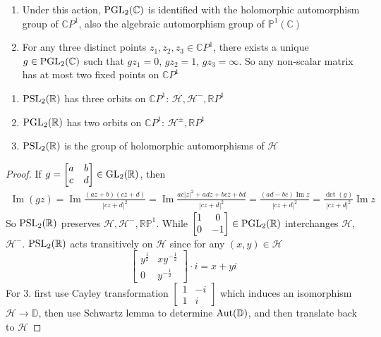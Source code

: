 \documentclass[main.tex]{subfiles}
\begin{document}
\begin{fact}\hfill
\begin{enumerate}
\item Under this action, $\operatorname{PGL}_2(\mathbb C)$ is identified with the holomorphic automorphism group of $\mathbb CP^1$, also the algebraic automorphism group of $\mathbb P^1(\mathbb C)$
\item For any three distinct points $z_1,z_2,z_3\in\mathbb CP^1$, there exists a unique $g\in\operatorname{PGL}_2(\mathbb C)$ such that $gz_1=0$, $gz_2=1$, $gz_3=\infty$. So any non-scalar matrix has at most two fixed points on $\mathbb CP^1$
\end{enumerate}
\end{fact}

\begin{lemma}\hfill
\begin{enumerate}
\item $\operatorname{PSL}_2(\mathbb R)$ has three orbits on $\mathbb CP^1$: $\mathcal H,\mathcal H^-,\mathbb RP^1$
\item $\operatorname{PGL}_2(\mathbb R)$ has two orbits on $\mathbb CP^1$: $\mathcal H^\pm,\mathbb RP^1$
\item $\operatorname{PSL}_2(\mathbb R)$ is the group of holomorphic automorphisms of $\mathcal H$
\end{enumerate}
\end{lemma}

\begin{proof}
If $g=\begin{bmatrix}
a&b\\
c&d
\end{bmatrix}\in \operatorname{GL}_2(\mathbb R)$, then
\begin{align*}
\operatorname{Im}(gz)=\operatorname{Im}\frac{(az+b)(c\bar z+d)}{|cz+d|^2}=\operatorname{Im}\frac{ac|z|^2+adz+bc\bar z+bd}{|cz+d|^2}=\frac{(ad-bc)\operatorname{Im}z}{|cz+d|^2} =\frac{\det(g)}{|cz+d|^2}\operatorname{Im}z
\end{align*}
So $\operatorname{PSL}_2(\mathbb R)$ preserves $\mathcal H,\mathcal H^-,\mathbb{RP}^1$. While $\begin{bmatrix}
1&0 \\
0&-1
\end{bmatrix}\in\operatorname{PGL}_2(\mathbb R)$ interchanges $\mathcal H$, $\mathcal H^-$. $\operatorname{PSL}_2(\mathbb R)$ acts transitively on $\mathcal H$ since for any $(x,y)\in\mathcal H$
\[\begin{bmatrix}
y^{\frac{1}{2}}&xy^{-\frac{1}{2}} \\
0&y^{-\frac{1}{2}}
\end{bmatrix}\cdot i=x+yi\]
For 3. first use Cayley transformation $\begin{bmatrix}
1&-i\\
1&i
\end{bmatrix}$ which induces an isomorphism $\mathcal H\to\mathbb D$, then use Schwartz lemma to determine $\operatorname{Aut}(\mathbb D)$, and then translate back to $\mathcal H$
\end{proof}
\end{document}
